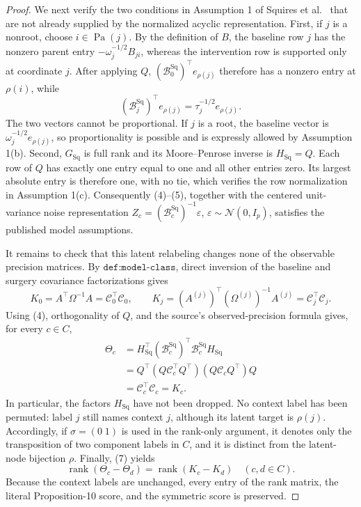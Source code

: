 \documentclass{article}
\begin{document}
\begin{proof}
We next verify the two conditions in Assumption 1 of Squires
et al.~\cite[Assumption 1]{pmlr-v202-squires23a} that
are not already supplied by the normalized acyclic representation.  First,
if \(j\) is a nonroot, choose \(i\in\operatorname{Pa}(j)\).  By the
definition of \(B\), the baseline row \(j\) has the nonzero parent entry
\(-\omega_j^{-1/2}B_{ji}\), whereas the intervention row is supported
only at coordinate \(j\).  After applying \(Q\),
\((\mathcal B_0^{\mathrm{Sq}})^{\top}e_{\rho(j)}\) therefore has a
nonzero entry at \(\rho(i)\), while
\[
 (\mathcal B_j^{\mathrm{Sq}})^{\top}e_{\rho(j)}
 =\tau_j^{-1/2}e_{\rho(j)}.
\]
The two vectors cannot be proportional.  If \(j\) is a root, the
baseline vector is \(\omega_j^{-1/2}e_{\rho(j)}\), so proportionality is
possible and is expressly allowed by Assumption 1(b).  Second,
\(G_{\mathrm{Sq}}\) is full rank and its Moore--Penrose inverse is
\(H_{\mathrm{Sq}}=Q\).  Each row of \(Q\) has exactly one entry equal to
one and all other entries zero.  Its largest absolute entry is therefore
one, with no tie, which verifies the row normalization in Assumption
1(c).  Consequently (4)--(5), together with the centered unit-variance
noise representation
\(Z_c=(\mathcal B_c^{\mathrm{Sq}})^{-1}\varepsilon\),
\(\varepsilon\sim\mathcal N(0,I_p)\), satisfies the published model
assumptions.

It remains to check that this latent relabeling changes none of the
observable precision matrices.  By \(\texttt{def:model-class}\), direct
inversion of the baseline and surgery covariance factorizations gives
\[
 K_0=A^{\top}\Omega^{-1}A=\mathcal C_0^{\top}\mathcal C_0,
 \qquad
 K_j=(A^{(j)})^{\top}(\Omega^{(j)})^{-1}A^{(j)}
     =\mathcal C_j^{\top}\mathcal C_j.                            \tag{6}
\]
Using (4), orthogonality of \(Q\), and the source's observed-precision
formula gives, for every \(c\in C\),
\[
 \begin{aligned}
 \Theta_c
 &=H_{\mathrm{Sq}}^{\top}
   (\mathcal B_c^{\mathrm{Sq}})^{\top}
   \mathcal B_c^{\mathrm{Sq}}H_{\mathrm{Sq}}\\
 &=Q^{\top}(Q\mathcal C_c^{\top}Q^{\top})
            (Q\mathcal C_cQ^{\top})Q\\
 &=\mathcal C_c^{\top}\mathcal C_c
 =K_c.                                                            \tag{7}
 \end{aligned}
\]
In particular, the factors \(H_{\mathrm{Sq}}\) have not been dropped.
No context label has been permuted: label \(j\) still names context
\(j\), although its latent target is \(\rho(j)\).  Accordingly, if
\(\sigma=(0\;1)\) is used in the rank-only argument, it denotes only the
transposition of two component labels in \(C\), and it is distinct from
the latent-node bijection \(\rho\).  Finally, (7) yields
\[
 \operatorname{rank}(\Theta_c-\Theta_d)
 =\operatorname{rank}(K_c-K_d)
 \quad(c,d\in C).
\]
Because the context labels are unchanged, every entry of the rank matrix,
the literal Proposition-10 score, and the symmetric score is preserved.
\end{proof}
\end{document}
